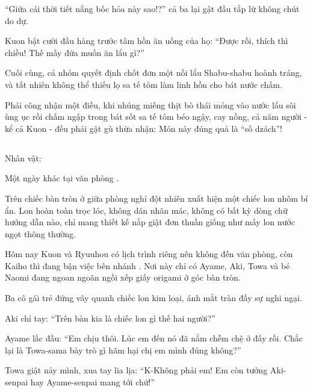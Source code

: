 \documentclass[../main.tex]{subfiles}
\begin{document}
``Giữa cái thời tiết nắng bốc hỏa này sao!?'' cả ba lại gật đầu tắp lừ không chút do dự.

Kuon bật cười đầu hàng trước tâm hồn ăn uống của họ: ``Được rồi, thích thì chiều! Thế mấy đứa muốn ăn lẩu gì?''

Cuối cùng, cả nhóm quyết định chốt đơn một nồi lẩu Shabu-shabu hoành tráng, và tất nhiên không thể thiếu lọ sa tế tôm làm linh hồn cho bát nước chấm.

Phải công nhận một điều, khi nhúng miếng thịt bò thái mỏng vào nước lẩu sôi ùng ục rồi chấm ngập trong bát sốt sa tế tôm béo ngậy, cay nồng, cả năm người - kể cả Kuon - đều phải gật gù thừa nhận: Món này đúng quả là ``số dzách''!

\newpage

\subsection*{\label{ep-C9.VI}}
\vspace{-4pt}
\begin{center}
  {\caviar\fontsize{12pt}{12pt}\selectfont Nhân vật:     }
\end{center}

Một ngày khác tại văn phòng \hll.

Trên chiếc bàn tròn ở giữa phòng nghỉ đột nhiên xuất hiện một chiếc lon nhôm bí ẩn. Lon hoàn toàn trọc lóc, không dán nhãn mác, không có bất kỳ dòng chữ hướng dẫn nào, chỉ mang thiết kế nắp giật đơn thuần giống như mấy lon nước ngọt thông thường.

Hôm nay Kuon và Ryuuhou có lịch trình riêng nên không đến văn phòng, còn Kaiho thì đang bận việc bên nhánh \hls. Nơi này chỉ có Ayame, Aki, Towa và bé Naomi đang ngoan ngoãn ngồi xếp giấy origami ở góc bàn tròn.

Ba cô gái trẻ đứng vây quanh chiếc lon kim loại, ánh mắt tràn đầy sự nghi ngại.

Aki chỉ tay: ``Trên bàn kia là chiếc lon gì thế hai người?''

Ayame lắc đầu: ``Em chịu thôi. Lúc em đến nó đã nằm chễm chệ ở đấy rồi. Chắc lại là Towa-sama bày trò gì hãm hại chị em mình đúng không?''

Towa giật nảy mình, xua tay lia lịa: ``K-Không phải em! Em còn tưởng Aki-senpai hay Ayame-senpai mang tới chứ!''
\end{document}

